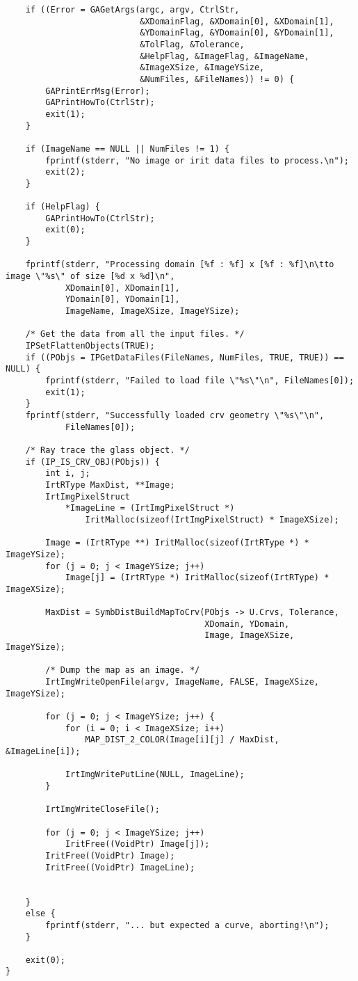 \begin{verbatim}
    if ((Error = GAGetArgs(argc, argv, CtrlStr,
                           &XDomainFlag, &XDomain[0], &XDomain[1],
                           &YDomainFlag, &YDomain[0], &YDomain[1],
                           &TolFlag, &Tolerance,
                           &HelpFlag, &ImageFlag, &ImageName,
                           &ImageXSize, &ImageYSize,
                           &NumFiles, &FileNames)) != 0) {
        GAPrintErrMsg(Error);
        GAPrintHowTo(CtrlStr);
        exit(1);
    }

    if (ImageName == NULL || NumFiles != 1) {
        fprintf(stderr, "No image or irit data files to process.\n");
        exit(2);
    }

    if (HelpFlag) {
        GAPrintHowTo(CtrlStr);
        exit(0);
    }

    fprintf(stderr, "Processing domain [%f : %f] x [%f : %f]\n\tto image \"%s\" of size [%d x %d]\n",
            XDomain[0], XDomain[1],
            YDomain[0], YDomain[1],
            ImageName, ImageXSize, ImageYSize);

    /* Get the data from all the input files. */
    IPSetFlattenObjects(TRUE);
    if ((PObjs = IPGetDataFiles(FileNames, NumFiles, TRUE, TRUE)) == NULL) {
        fprintf(stderr, "Failed to load file \"%s\"\n", FileNames[0]);
        exit(1);
    }
    fprintf(stderr, "Successfully loaded crv geometry \"%s\"\n",
            FileNames[0]);

    /* Ray trace the glass object. */
    if (IP_IS_CRV_OBJ(PObjs)) {
        int i, j;
        IrtRType MaxDist, **Image;
        IrtImgPixelStruct
            *ImageLine = (IrtImgPixelStruct *)
                IritMalloc(sizeof(IrtImgPixelStruct) * ImageXSize);

        Image = (IrtRType **) IritMalloc(sizeof(IrtRType *) * ImageYSize);
        for (j = 0; j < ImageYSize; j++)
            Image[j] = (IrtRType *) IritMalloc(sizeof(IrtRType) * ImageXSize);

        MaxDist = SymbDistBuildMapToCrv(PObjs -> U.Crvs, Tolerance,
                                        XDomain, YDomain,
                                        Image, ImageXSize, ImageYSize);

        /* Dump the map as an image. */
        IrtImgWriteOpenFile(argv, ImageName, FALSE, ImageXSize, ImageYSize);

        for (j = 0; j < ImageYSize; j++) {
            for (i = 0; i < ImageXSize; i++)
                MAP_DIST_2_COLOR(Image[i][j] / MaxDist, &ImageLine[i]);

            IrtImgWritePutLine(NULL, ImageLine);
        }

        IrtImgWriteCloseFile();

        for (j = 0; j < ImageYSize; j++)
            IritFree((VoidPtr) Image[j]);
        IritFree((VoidPtr) Image);
        IritFree((VoidPtr) ImageLine);


    }
    else {
        fprintf(stderr, "... but expected a curve, aborting!\n");
    }

    exit(0);
}
\end{verbatim}

